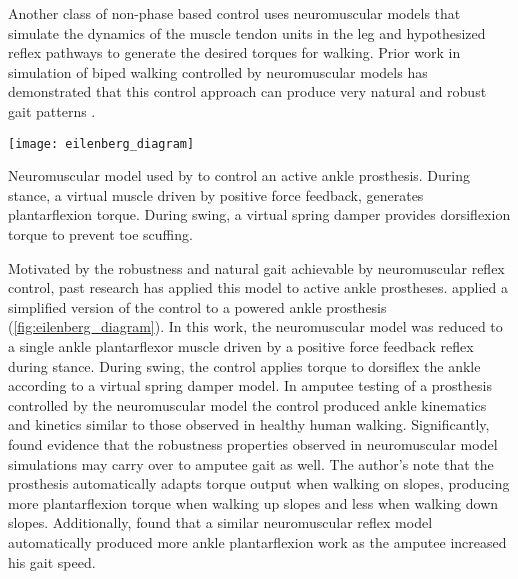 Another class of non-phase based control uses neuromuscular models that simulate
the dynamics of the muscle tendon units in the leg and hypothesized reflex
pathways to generate the desired torques for walking. Prior work in simulation
of biped walking controlled by neuromuscular models has demonstrated that this
control approach can produce very natural and robust gait patterns
\citep{geyer2010muscle,song2013integration,song2015neural}.
\begin{marginfigure}[1in]
    \centering
    \texttt{[image: eilenberg\_diagram]} 
    \caption[Neuromuscular model used by \citet{eilenberg2010control} to control
    an active ankle prosthesis.]{Neuromuscular model used by
    \citet{eilenberg2010control} to control an active ankle prosthesis. During
    stance, a virtual muscle driven by positive force feedback, generates
    plantarflexion torque. During swing, a virtual spring damper provides
    dorsiflexion torque to prevent toe scuffing.}\label{fig:eilenberg_diagram}
\end{marginfigure}
Motivated by the robustness and natural gait achievable by neuromuscular reflex
control, past research has applied this model to active ankle prostheses.
\citet{eilenberg2010control} applied a simplified version of the control to a
powered ankle prosthesis (\cref{fig:eilenberg_diagram}). In this work, the
neuromuscular model was reduced to a single ankle plantarflexor muscle driven by
a positive force feedback reflex during stance. During swing, the control
applies torque to dorsiflex the ankle according to a virtual spring damper
model. In amputee testing of a prosthesis controlled by the neuromuscular model
the control produced ankle kinematics and kinetics similar to those observed in
healthy human walking. Significantly, \citeauthor{eilenberg2010control} found
evidence that the robustness  properties observed in neuromuscular model
simulations may carry over to amputee gait as well. The author's note that the
prosthesis automatically adapts torque output when walking on slopes, producing
more plantarflexion torque when walking up slopes and less when walking down
slopes. Additionally, \citet{markowitz2011speed} found that a similar
neuromuscular reflex model automatically produced more ankle plantarflexion work
as the amputee increased his gait speed.

